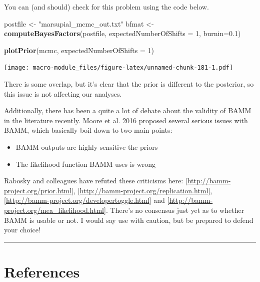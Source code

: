 \documentclass[]{book}
\newenvironment{Shaded}{\begin{snugshade}}{\end{snugshade}}
\newcommand{\KeywordTok}[1]{\textcolor[rgb]{0.13,0.29,0.53}{\textbf{{#1}}}}
\newcommand{\DataTypeTok}[1]{\textcolor[rgb]{0.13,0.29,0.53}{{#1}}}
\newcommand{\DecValTok}[1]{\textcolor[rgb]{0.00,0.00,0.81}{{#1}}}
\newcommand{\FloatTok}[1]{\textcolor[rgb]{0.00,0.00,0.81}{{#1}}}
\newcommand{\StringTok}[1]{\textcolor[rgb]{0.31,0.60,0.02}{{#1}}}
\newcommand{\NormalTok}[1]{{#1}}
\providecommand{\tightlist}{%
  \setlength{\itemsep}{0pt}\setlength{\parskip}{0pt}}
\begin{document}
You can (and should) check for this problem using the code below.

\begin{Shaded}
\begin{Highlighting}[]
\NormalTok{postfile <-}\StringTok{ "marsupial_mcmc_out.txt"}
\NormalTok{bfmat <-}\StringTok{ }\KeywordTok{computeBayesFactors}\NormalTok{(postfile, }\DataTypeTok{expectedNumberOfShifts =} \DecValTok{1}\NormalTok{, }\DataTypeTok{burnin=}\FloatTok{0.1}\NormalTok{)}

\KeywordTok{plotPrior}\NormalTok{(mcmc, }\DataTypeTok{expectedNumberOfShifts =} \DecValTok{1}\NormalTok{)}
\end{Highlighting}
\end{Shaded}

\texttt{[image: macro-module\_files/figure-latex/unnamed-chunk-181-1.pdf]}

There is some overlap, but it's clear that the prior is different to the
posterior, so this issue is not affecting our analyses.

Additionally, there has been a quite a lot of debate about the validity
of BAMM in the literature recently. Moore et al. 2016 proposed several
serious issues with BAMM, which basically boil down to two main points:

\begin{itemize}
\tightlist
\item
  BAMM outputs are highly sensitive the priors
\item
  The likelihood function BAMM uses is wrong
\end{itemize}

Rabosky and colleagues have refuted these criticisms here:
{[}\url{http://bamm-project.org/prior.html}{]},
{[}\url{http://bamm-project.org/replication.html}{]},
{[}\url{http://bamm-project.org/developertoggle.html}{]} and
{[}\url{http://bamm-project.org/mea_likelihood.html}{]}. There's no
consensus just yet as to whether BAMM is usable or not. I would say use
with caution, but be prepared to defend your choice!

\begin{center}\rule{0.5\linewidth}{\linethickness}\end{center}

\section{References}\label{references-5}
\end{document}
